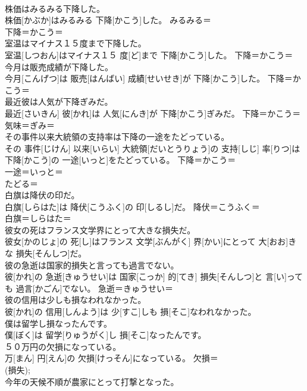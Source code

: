 \documentclass[8pt]{extreport}
\begin{document}
\begin{CJK}{UTF8}{min}
\\	株価はみるみる下降した。	
\\	株価[かぶか]はみるみる 下降[かこう]した。	みるみる＝ 
\\	下降＝かこう＝ 
\\	室温はマイナス１５度まで下降した。	
\\	室温[しつおん]はマイナス１５ 度[ど]まで 下降[かこう]した。	下降＝かこう＝ 
\\	今月は販売成績が下降した。	
\\	今月[こんげつ]は 販売[はんばい] 成績[せいせき]が 下降[かこう]した。	下降＝かこう＝ 
\\	最近彼は人気が下降ぎみだ。	
\\	最近[さいきん] 彼[かれ]は 人気[にんき]が 下降[かこう]ぎみだ。	下降＝かこう＝ 
\\	気味＝ぎみ＝ 
\\	その事件以来大統領の支持率は下降の一途をたどっている。	
\\	その 事件[じけん] 以来[いらい] 大統領[だいとうりょう]の 支持[しじ] 率[りつ]は 下降[かこう]の 一途[いっと]をたどっている。	下降＝かこう＝ 
\\	一途＝いっと＝ 
\\	たどる＝ 
\\	白旗は降伏の印だ。	
\\	白旗[しらはた]は 降伏[こうふく]の 印[しるし]だ。	降伏＝こうふく＝ 
\\	白旗＝しらはた＝ 
\\	彼女の死はフランス文学界にとって大きな損失だ。	
\\	彼女[かのじょ]の 死[し]はフランス 文学[ぶんがく] 界[かい]にとって 大[おお]きな 損失[そんしつ]だ。	
\\	彼の急逝は国家的損失と言っても過言でない。	
\\	彼[かれ]の 急逝[きゅうせい]は 国家[こっか] 的[てき] 損失[そんしつ]と 言[い]っても 過言[かごん]でない。	急逝＝きゅうせい＝ 
\\	彼の信用は少しも損なわれなかった。	
\\	彼[かれ]の 信用[しんよう]は 少[すこ]しも 損[そこ]なわれなかった。	
\\	僕は留学し損なったんです。	
\\	僕[ぼく]は 留学[りゅうがく]し 損[そこ]なったんです。	
\\	５０万円の欠損になっている。	
\\	万[まん] 円[えん]の 欠損[けっそん]になっている。	欠損＝ 
\\	(損失); 
\\	今年の天候不順が農家にとって打撃となった。	

\end{CJK}
\end{document}
